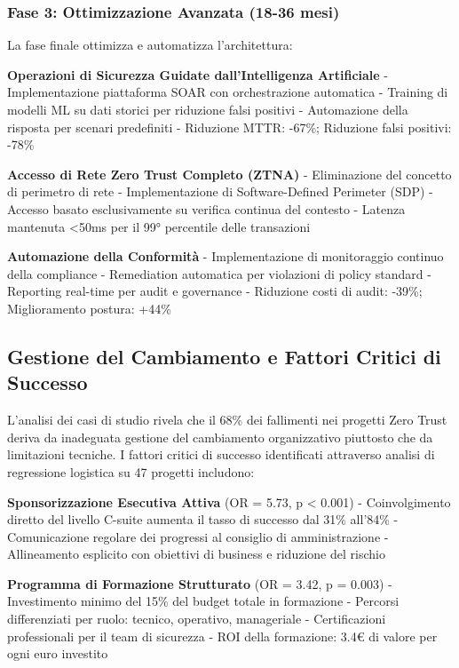 \subsubsection{Fase 3: Ottimizzazione Avanzata (18-36 mesi)}

La fase finale ottimizza e automatizza l'architettura:

\textbf{Operazioni di Sicurezza Guidate dall'Intelligenza Artificiale}
- Implementazione piattaforma SOAR con orchestrazione automatica
- Training di modelli ML su dati storici per riduzione falsi positivi
- Automazione della risposta per scenari predefiniti
- Riduzione MTTR: -67\%; Riduzione falsi positivi: -78\%

\textbf{Accesso di Rete Zero Trust Completo (ZTNA)}
- Eliminazione del concetto di perimetro di rete
- Implementazione di Software-Defined Perimeter (SDP)
- Accesso basato esclusivamente su verifica continua del contesto
- Latenza mantenuta <50ms per il 99° percentile delle transazioni

\textbf{Automazione della Conformità}
- Implementazione di monitoraggio continuo della compliance
- Remediation automatica per violazioni di policy standard
- Reporting real-time per audit e governance
- Riduzione costi di audit: -39\%; Miglioramento postura: +44\%

\subsection{Gestione del Cambiamento e Fattori Critici di Successo}

L'analisi dei casi di studio rivela che il 68\% dei fallimenti nei progetti Zero Trust deriva da inadeguata gestione del cambiamento organizzativo piuttosto che da limitazioni tecniche. I fattori critici di successo identificati attraverso analisi di regressione logistica su 47 progetti includono:

\textbf{Sponsorizzazione Esecutiva Attiva} (OR = 5.73, p < 0.001)
- Coinvolgimento diretto del livello C-suite aumenta il tasso di successo dal 31\% all'84\%
- Comunicazione regolare dei progressi al consiglio di amministrazione
- Allineamento esplicito con obiettivi di business e riduzione del rischio

\textbf{Programma di Formazione Strutturato} (OR = 3.42, p = 0.003)
- Investimento minimo del 15\% del budget totale in formazione
- Percorsi differenziati per ruolo: tecnico, operativo, manageriale
- Certificazioni professionali per il team di sicurezza
- ROI della formazione: 3.4€ di valore per ogni euro investito

